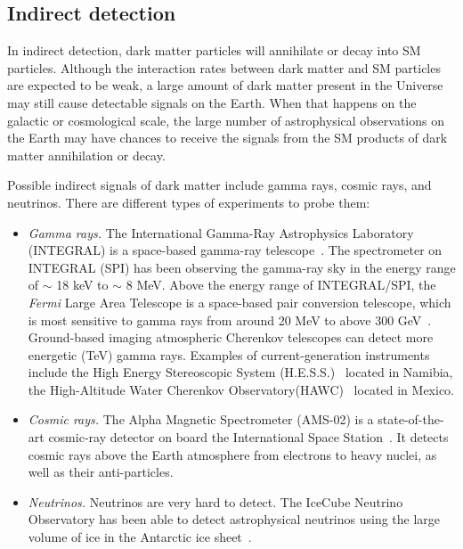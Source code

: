 \documentclass[doublespace,nopageskip]{VTthesis}
\begin{document}
\subsection{Indirect detection}\label{sse:indirect}

In indirect detection, dark matter particles will annihilate or decay into SM particles. Although the interaction rates between dark matter and SM particles are expected to be weak, a large amount of dark matter present in the Universe may still cause detectable signals on the Earth. When that happens on the galactic or cosmological scale, the large number of astrophysical observations on the Earth may have chances to receive the signals from the SM products of dark matter annihilation or decay. 

Possible indirect signals of dark matter include gamma rays, cosmic rays, and neutrinos. There are different types of experiments to probe them:
\begin{itemize}
    \item \emph{Gamma rays.} The International Gamma-Ray Astrophysics Laboratory (INTEGRAL) is a space-based gamma-ray telescope~\cite{1992eocm.rept..227W}. The spectrometer on INTEGRAL (SPI) has been observing the gamma-ray sky in the energy range of $\sim$ 18 keV to $\sim$ 8 MeV. Above the energy range of INTEGRAL/SPI, the \textit{Fermi} Large Area Telescope is a space-based pair conversion telescope, which is most sensitive to gamma rays from around 20 MeV to above 300 GeV~\cite{2009ApJ...697.1071A}. Ground-based imaging atmospheric Cherenkov telescopes can detect more energetic (TeV) gamma rays. Examples of current-generation instruments include the High Energy Stereoscopic System (H.E.S.S.)~\cite{2002APS..APRU11010K} located in Namibia, the High-Altitude Water Cherenkov Observatory(HAWC)~\cite{2007APS..APRM11009D} located in Mexico.
    \item \emph{Cosmic rays.} The Alpha Magnetic Spectrometer (AMS-02) is a state-of-the-art cosmic-ray detector on board the International Space Station~\cite{2001ICRC....6.2192B}. It detects cosmic rays above the Earth atmosphere from electrons to heavy nuclei, as well as their anti-particles.
    \item \emph{Neutrinos.} Neutrinos are very hard to detect. The IceCube Neutrino Observatory has been able to detect astrophysical neutrinos using the large volume of ice in the Antarctic ice sheet~\cite{2003NuPhS.118..388K}.
\end{itemize}
\end{document}

